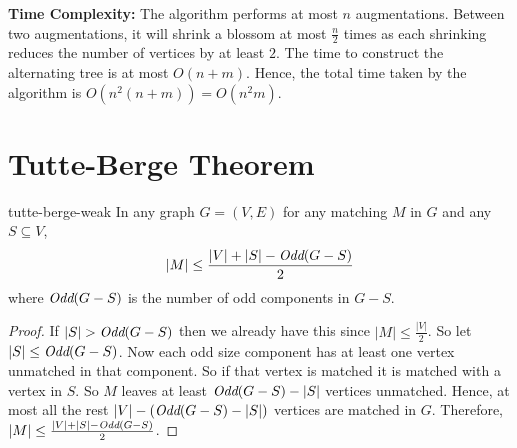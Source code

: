 \textbf{Time Complexity:} The algorithm performs at most $n$ augmentations. Between two augmentations, it will shrink a blossom at most $\frac{n}{2}$ times as each shrinking reduces the number of vertices by at least $2$. The time to construct the alternating tree is at most $O(n+m)$. Hence, the total time taken by the algorithm is $O(n^2(n+m))=O(n^2m)$. \parinn
\section{Tutte-Berge Theorem}
\begin{Theorem}{}{tutte-berge-weak}
	In any graph $G=(V,E)$ for any matching $M$ in $G$ and any $S\subseteq V$, $$|M|\leq\frac{|V|+|S|-\emph{Odd}(G-S)}2$$ where $\emph{Odd}(G-S)$ is the number of odd components in $G-S$.
\end{Theorem}
\begin{proof}
	If $|S|>\emph{Odd}(G-S)$ then we already have this since $|M|\leq\frac{|V|}{2}$. So let $|S|\leq \emph{Odd}(G-S)$. Now each odd size component has at least one vertex unmatched in that component. So if that vertex is matched it is matched with a vertex in $S$. So $M$ leaves at least $\emph{Odd}(G-S)-|S|$ vertices unmatched. Hence, at most all the rest $|V|-(\emph{Odd}(G-S)-|S|)$ vertices are matched in $G$. Therefore, $|M|\leq\frac{|V|+|S|-\emph{Odd}(G-S)}2$.
\end{proof}

